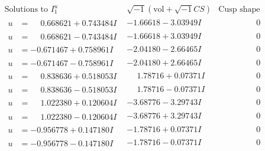 \documentclass[1p]{elsarticle_modified}
\theoremstyle{definition}
\newcommand{\I}{\sqrt{-1}}
\begin{document}
$$\begin{array}{c|c|c}  
\text{Solutions to }I^u_{1}& \I (\text{vol} + \sqrt{-1}CS) & \text{Cusp shape}\\
 \hline 
\begin{aligned}
u &= \phantom{-}0.668621 + 0.743484 I\end{aligned}
 & -1.66618 - 3.03949 I & \phantom{-0.000000 } 0 \\ \hline\begin{aligned}
u &= \phantom{-}0.668621 - 0.743484 I\end{aligned}
 & -1.66618 + 3.03949 I & \phantom{-0.000000 } 0 \\ \hline\begin{aligned}
u &= -0.671467 + 0.758961 I\end{aligned}
 & -2.04180 - 2.66465 I & \phantom{-0.000000 } 0 \\ \hline\begin{aligned}
u &= -0.671467 - 0.758961 I\end{aligned}
 & -2.04180 + 2.66465 I & \phantom{-0.000000 } 0 \\ \hline\begin{aligned}
u &= \phantom{-}0.838636 + 0.518053 I\end{aligned}
 & \phantom{-}1.78716 + 0.07371 I & \phantom{-0.000000 } 0 \\ \hline\begin{aligned}
u &= \phantom{-}0.838636 - 0.518053 I\end{aligned}
 & \phantom{-}1.78716 - 0.07371 I & \phantom{-0.000000 } 0 \\ \hline\begin{aligned}
u &= \phantom{-}1.022380 + 0.120604 I\end{aligned}
 & -3.68776 - 3.29743 I & \phantom{-0.000000 } 0 \\ \hline\begin{aligned}
u &= \phantom{-}1.022380 - 0.120604 I\end{aligned}
 & -3.68776 + 3.29743 I & \phantom{-0.000000 } 0 \\ \hline\begin{aligned}
u &= -0.956778 + 0.147180 I\end{aligned}
 & -1.78716 + 0.07371 I & \phantom{-0.000000 } 0 \\ \hline\begin{aligned}
u &= -0.956778 - 0.147180 I\end{aligned}
 & -1.78716 - 0.07371 I & \phantom{-0.000000 } 0 \\ \hline\begin{aligned}

\end{aligned}
\end{array}$$
\end{document}
